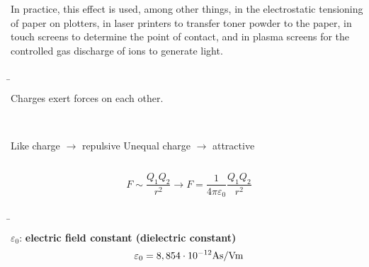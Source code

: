 \begin{frame}
{			In practice, this effect is used, among other things, in the electrostatic tensioning of paper on plotters, 
			in laser printers to transfer toner powder to the paper, in touch screens to
			determine the point of contact, and in plasma screens for the controlled 
			gas discharge of ions to generate light.
		}


		\b{
		\hspace{-9pt}Charges exert forces on each other.\\
		\phantom{text}\\
		\begin{columns}
			Like charge $\rightarrow$ repulsive 
			Unequal charge $\rightarrow$ attractive
		\end{columns}
 
		\begin{figure}[h!]
			\centering
			\label{fig:coulomb}
		\end{figure}

		\pause
		\pause
		
	



		\begin{equation*}
			F \sim \frac{Q_1 Q_2}{r^2} \rightarrow F = \frac{1}{4 \pi \varepsilon_0} \frac{Q_1 Q_2}{r^2} 
		\end{equation*}

		}

		\pause
		\b{

		$\varepsilon_0$: \textbf{electric field constant (dielectric constant)} 
		\begin{equation*}
			\varepsilon_0 = 8,854 \cdot 10^{-12} \rm{As/Vm}
		\end{equation*}  

		}


\end{frame}
